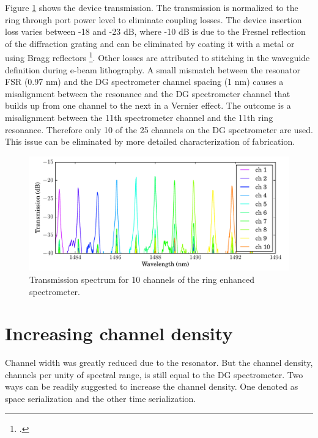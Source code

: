 \documentclass[12pt,twoside,english]{book}
\renewcommand{\~}{\perispomeni}%
\numberwithin{equation}{section}
\numberwithin{figure}{section}
\begin{document}
Figure \ref{fig:RES spectrum} shows the device transmission. The transmission is normalized to the ring through port power level to eliminate coupling losses. The device insertion loss varies between -18 and -23 dB, where -10 dB is due to the Fresnel reflection of the diffraction grating and can be eliminated by coating it with a metal or using Bragg reflectors \footcite{Brouckaert:2008p108}. Other losses are attributed to stitching in the waveguide definition during e-beam lithography. A small mismatch between the resonator FSR (0.97 nm) and the DG spectrometer channel spacing (1 nm) causes a misalignment between the resonance and the DG spectrometer channel that builds up from one channel to the next in a Vernier effect. The outcome is a misalignment between the 11th spectrometer channel and the 11th ring resonance. Therefore only 10 of the 25 channels on the DG spectrometer are used. This issue can be eliminated by more detailed characterization of fabrication.
\begin{figure}[h] \noindent \begin{centering}
\includegraphics{graphs/low-density-ring-enhanced}
\par\end{centering}
\caption{Transmission spectrum for 10 channels of the ring enhanced spectrometer.\label{fig:RES spectrum}}
\end{figure} 


\section{Increasing channel density}

Channel width was greatly reduced due to the resonator. But the channel density, channels per unity of spectral range, is still equal to the DG spectrometer. Two ways can be readily suggested to increase the channel density. One denoted as space serialization and the other time serialization. 
\end{document}

